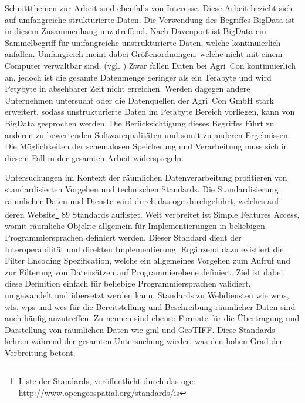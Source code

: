 Schnittthemen zur Arbeit sind ebenfalls von Interesse.
Diese Arbeit bezieht sich auf umfangreiche strukturierte Daten.
Die Verwendung des Begriffes BigData ist in diesem Zusammenhang unzutreffend.
Nach Davenport ist BigData ein Sammelbegriff für umfangreiche unstrukturierte Daten, welche kontinuierlich anfallen.
Umfangreich meint dabei Größenordnungen, welche nicht mit einem Computer verwaltbar sind. (vgl. \cite[S.1]{book:bigdata})
Zwar fallen Daten bei Agri~Con kontinuierlich an, jedoch ist die gesamte Datenmenge geringer als ein Terabyte und wird Petybyte in absehbarer Zeit nicht erreichen.
Werden dagegen andere Unternehmen untersucht oder die Datenquellen der Agri~Con GmbH stark erweitert, sodass unstrukturierte Daten im Petabyte Bereich vorliegen, kann von BigData gesprochen werden.
Die Berücksichtigung dieses Begriffes führt zu anderen zu bewertenden Softwarequalitäten und somit zu anderen Ergebnissen.
Die Möglichkeiten der schemalosen Speicherung und Verarbeitung muss sich in diesem Fall in der gesamten Arbeit widerspiegeln.

Untersuchungen im Kontext der räumlichen Datenverarbeitung profitieren von standardisierten Vorgehen und technischen Standards.
Die Standardisierung räumlicher Daten und Dienste wird durch das \Gls{ogc} durchgeführt, welches auf deren Website\footnote{Liste der Standards, veröffentlicht durch das \Gls{ogc}: \url{http://www.opengeospatial.org/standards/is}} 89 Standards auflistet.
Weit verbreitet ist Simple Features Access, womit räumliche Objekte allgemein für Implementierungen in beliebigen Programmiersprachen definiert werden.
Dieser Standard dient der Interoperabilität und direkten Implementierung.
Ergänzend dazu existiert die Filter Encoding Spezification, welche ein allgemeines Vorgehen zum Aufruf und zur Filterung von Datensätzen auf Programmierebene definiert.
Ziel ist dabei, diese Definition einfach für beliebige Programmiersprachen validiert, umgewandelt und übersetzt werden kann.
Standards zu Webdiensten wie \Gls{wms}, \Gls{wfs}, \Gls{wps} und \Gls{wcs} für die Bereitstellung und Beschreibung räumlicher Daten sind auch häufig anzutreffen.
Zu nennen sind ebenso Formate für die Übertragung und Darstellung von räumlichen Daten wie \Gls{gml} und GeoTIFF.
Diese Standards kehren während der gesamten Untersuchung wieder, was den hohen Grad der Verbreitung betont.

